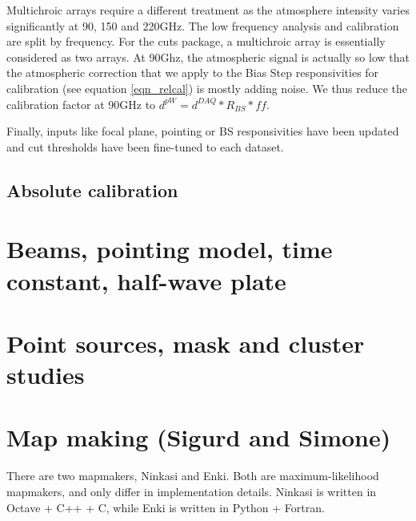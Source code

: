 \documentclass[a4paper, 11pt]{article}
\begin{document}
Multichroic arrays require a different treatment as the atmosphere intensity varies significantly at 90, 150 and 220GHz. The low frequency analysis and calibration are split by frequency. For the cuts package, a multichroic array is essentially considered as two arrays. At 90Ghz, the atmospheric signal is actually so low that the atmospheric correction that we apply to the Bias Step responsivities for calibration (see equation \ref{eqn_relcal}) is mostly adding noise. We thus reduce the calibration factor at 90GHz to $d^{pW} = d^{DAQ} * R_{BS} * ff$.

Finally, inputs like focal plane, pointing or BS responsivities have been updated and cut thresholds have been fine-tuned to each dataset.


\subsection{Absolute calibration}



\section{Beams, pointing model, time constant, half-wave plate}

\section{Point sources, mask and cluster studies}

\section{Map making (Sigurd and Simone)}
There are two mapmakers, Ninkasi and Enki. Both are maximum-likelihood mapmakers,
and only differ in implementation details. Ninkasi is written in Octave + C++ + C,
while Enki is written in Python + Fortran.
\end{document}
